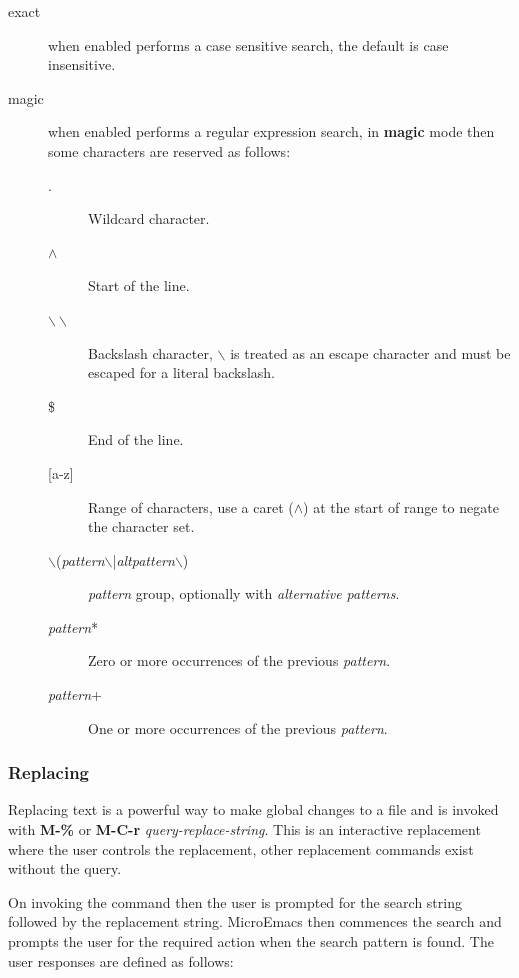 \documentclass[11pt,a4paper,pdftex]{article}
\begin{document}
  \begin{description}
    \item[exact] when enabled performs a case sensitive search, the default is
      case insensitive.

    \item[magic] when enabled performs a regular expression search, in
    \textbf{magic} mode then some characters are reserved as follows:

      \begin{description}
        \item[.] Wildcard character.
        \item[$\wedge$] Start of the line.
        \item[$\backslash\backslash$] Backslash character, $\backslash$ is
        treated as an escape character and must be escaped for a literal
        backslash.
        \item[\$] End of the line.
        \item[{[}a-z{]}] Range of characters, use a caret ($\wedge$) at the
        start of range to negate the character set.
        \item[$\backslash$(\textit{pattern}$\backslash$|\textit{altpattern}$\backslash$)]
        \textit{pattern} group, optionally with \textit{alternative patterns}.
        \item[\textit{pattern}*] Zero or more occurrences of the previous \textit{pattern}.
        \item[\textit{pattern}+] One or more occurrences of the previous \textit{pattern}.
      \end{description}

  \end{description}

\subsubsection{Replacing}

  Replacing text is a powerful way to make global changes to a file and is
  invoked with \textbf{M-\%} or \textbf{M-C-r} \textit{query-replace-string}.
  This is an interactive replacement where the user controls the replacement,
  other replacement commands exist without the query.

  On invoking the command then the user is prompted for the search string
  followed by the replacement string. MicroEmacs then commences the search and
  prompts the user for the required action when the search pattern is found.
  The user responses are defined as follows:
\end{document}
